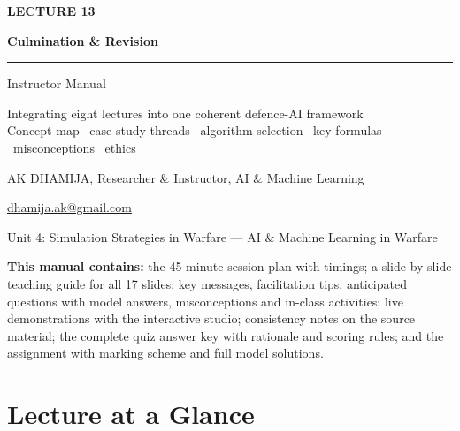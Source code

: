 \documentclass[11pt]{article}
\begin{document}
\begin{titlepage}\centering\vspace*{2.2cm}
{\color{AccN}\large\bfseries LECTURE 13\par}\vspace{0.6cm}
{\color{NavyN}\Huge\bfseries Culmination \& Revision\par}\vspace{0.6cm}
{\color{AccN}\rule{0.7\textwidth}{1.5pt}}\par\vspace{0.6cm}
{\LARGE Instructor Manual\par}\vspace{0.4cm}
{\large\begin{minipage}{0.85\textwidth}\centering Integrating eight lectures into one coherent defence-AI framework\\Concept map \textbullet\ case-study threads \textbullet\ algorithm selection \textbullet\ key formulas \textbullet\ misconceptions \textbullet\ ethics\end{minipage}\par}\vspace{2cm}
{\large AK DHAMIJA, Researcher \& Instructor, AI \& Machine Learning\par}\vspace{0.2cm}
{\normalsize \href{mailto:dhamija.ak@gmail.com}{dhamija.ak@gmail.com} \quad\textbullet{}\par}\vspace{0.3cm}
{Unit 4: Simulation Strategies in Warfare --- AI \& Machine Learning in Warfare\par}\vfill
\begin{tcolorbox}[colback=NavyN!4,colframe=NavyN,boxrule=0.6pt,arc=2pt,width=0.9\textwidth]\small
\textbf{This manual contains:} the 45-minute session plan with timings; a slide-by-slide teaching guide for all 17 slides; key messages, facilitation tips, anticipated questions with model answers, misconceptions and in-class activities; live demonstrations with the interactive studio; consistency notes on the source material; the complete quiz answer key with rationale and scoring rules; and the assignment with marking scheme and full model solutions.
\end{tcolorbox}
\end{titlepage}
\tableofcontents\newpage


\section{Lecture at a Glance}
\end{document}
